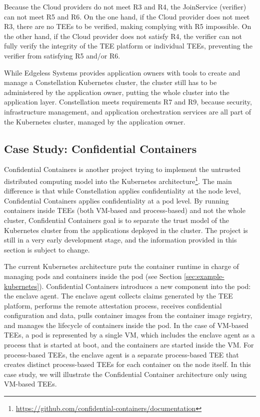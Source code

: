 Because the Cloud providers do not meet R3 and R4, the JoinService (verifier)
can not meet R5 and R6. On the one hand, if the Cloud provider does not meet R3,
there are no TEEs to be verified, making complying with R5 impossible. On the
other hand, if the Cloud provider does not satisfy R4, the verifier can not
fully verify the integrity of the TEE platform or individual TEEs, preventing
the verifier from satisfying R5 and/or R6.

While Edgeless Systems provides application owners with tools to create and
manage a Constellation Kubernetes cluster, the cluster still has to be
administered by the application owner, putting the whole cluster into the
application layer. Constellation meets requirements R7 and R9, because security,
infrastructure management, and application orchestration services are all part
of the Kubernetes cluster, managed by the application owner.

\subsection{Case Study: Confidential Containers}

Confidential Containers is another project trying to implement the untrusted
distributed computing model into the Kubernetes
architecture\footnote{\url{https://github.com/confidential-containers/documentation}}.
The main difference is that while Constellation applies confidentiality at the
node level, Confidential Containers applies confidentiality at a pod level. By
running containers inside TEEs (both VM-based and process-based) and not the
whole cluster, Confidential Containers goal is to separate the trust model of
the Kubernetes cluster from the applications deployed in the cluster. The
project is still in a very early development stage, and the information provided
in this section is subject to change.

The current Kubernetes architecture puts the container runtime in charge of
managing pods and containers inside the pod (see Section
\ref{sec:example-kubernetes}). Confidential Containers introduces a new
component into the pod: the enclave agent. The enclave agent collects claims
generated by the TEE platform, performs the remote attestation process, receives
confidential configuration and data, pulls container images from the container
image registry, and manages the lifecycle of containers inside the pod. In the
case of VM-based TEEs, a pod is represented by a single VM, which includes the
enclave agent as a process that is started at boot, and the containers are
started inside the VM. For process-based TEEs, the enclave agent is a separate
process-based TEE that creates distinct process-based TEEs for each container on
the node itself. In this case study, we will illustrate the Confidential
Container architecture only using VM-based TEEs.


